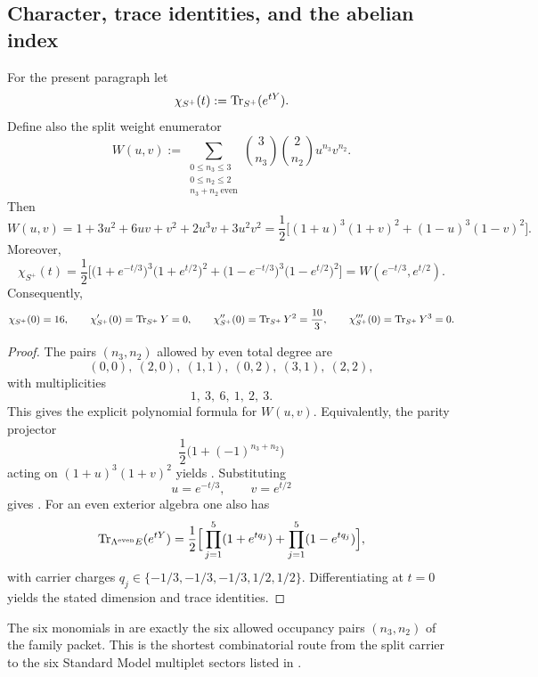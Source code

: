 \subsection{Character, trace identities, and the abelian index}

\begin{proposition}
\label{prop:split-weight-enumerator}
For the present paragraph let
\[
\chi_{S^+}(t):=\operatorname{Tr}_{S^+}(e^{tY}).
\]
Define also the split weight enumerator
\[
W(u,v)
:=
\sum_{\substack{0\le n_3\le 3\\ 0\le n_2\le 2\\ n_3+n_2\ \mathrm{even}}}
\binom{3}{n_3}\binom{2}{n_2}u^{n_3}v^{n_2}.
\]
Then
\begin{equation}
\label{eq:split-weight-enumerator}
W(u,v)
=
1+3u^2+6uv+v^2+2u^3v+3u^2v^2
=
\frac12\Big[(1+u)^3(1+v)^2+(1-u)^3(1-v)^2\Big].
\end{equation}
Moreover,
\begin{equation}
\label{eq:family-character}
\chi_{S^+}(t)
=
\frac12\Big[
\bigl(1+e^{-t/3}\bigr)^3\bigl(1+e^{t/2}\bigr)^2
+
\bigl(1-e^{-t/3}\bigr)^3\bigl(1-e^{t/2}\bigr)^2
\Big]
=
W(e^{-t/3},e^{t/2}).
\end{equation}
Consequently,
\[
\chi_{S^+}(0)=16,
\qquad
\chi_{S^+}'(0)=\operatorname{Tr}_{S^+}Y=0,
\qquad
\chi_{S^+}''(0)=\operatorname{Tr}_{S^+}Y^2=\frac{10}{3},
\qquad
\chi_{S^+}'''(0)=\operatorname{Tr}_{S^+}Y^3=0.
\]
\end{proposition}

\begin{proof}
The pairs $(n_3,n_2)$ allowed by even total degree are
\[
(0,0),\ (2,0),\ (1,1),\ (0,2),\ (3,1),\ (2,2),
\]
with multiplicities
\[
1,\ 3,\ 6,\ 1,\ 2,\ 3.
\]
This gives the explicit polynomial formula for $W(u,v)$. Equivalently, the parity projector
\[
\frac12\bigl(1+(-1)^{n_3+n_2}\bigr)
\]
acting on $(1+u)^3(1+v)^2$ yields . Substituting
\[
u=e^{-t/3},
\qquad
v=e^{t/2}
\]
gives . For an even exterior algebra one also has
\[
\operatorname{Tr}_{\Lambda^{\mathrm{even}}E}(e^{tY})
=
\frac12\Big[\prod_{j=1}^5(1+e^{tq_j})+\prod_{j=1}^5(1-e^{tq_j})\Big],
\]
with carrier charges $q_j\in\{-1/3,-1/3,-1/3,1/2,1/2\}$. Differentiating at $t=0$ yields the stated dimension and trace identities.
\end{proof}

\begin{remark}
The six monomials in  are exactly the six allowed occupancy pairs $(n_3,n_2)$ of the family packet. This is the shortest combinatorial route from the split carrier to the six Standard Model multiplet sectors listed in .
\end{remark}


